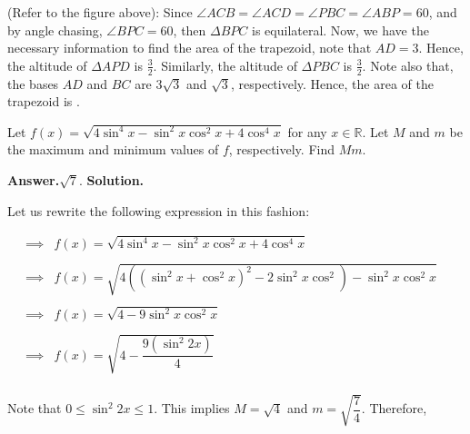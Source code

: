 \documentclass[12pt,paper=letter]{scrartcl}
\newcommand{\ans}[1]{{\sffamily \bfseries Answer.}\;\(\boxed{\text{#1}}\).}
\newcommand{\sol}{{\sffamily \bfseries Solution.}\;}
\begin{document}
(Refer to the figure above): Since $\angle ACB = \angle ACD = \angle PBC = \angle ABP = 60$, and by angle chasing, $\angle BPC = 60$, then $\Delta BPC$ is equilateral. Now, we have the necessary information to find the area of the trapezoid, note that $AD = 3$. Hence, the altitude of $\Delta APD$ is $\frac{3}{2}$. Similarly, the altitude of $\Delta PBC$ is $\frac{3}{2}$. Note also that, the bases $AD$ and $BC$ are $3\sqrt{3}$ and $\sqrt{3}$, respectively. Hence, the area of the trapezoid is .


\begin{probboxed} Let $f(x) = \sqrt{4\sin^4 x - \sin^2 x \cos^2 x + 4\cos^4 x }$ for any $x \in \mathbb{R}$. Let $M$ and $m$ be the maximum and minimum values of $f$, respectively. Find $Mm$.
\end{probboxed}

\ans{$\sqrt{7}$}
\sol

Let us rewrite the following expression in this fashion: 

\begin{equation*}
    \begin{array}{lll}
       \implies & f(x) = \sqrt{4\sin^4 x - \sin^2 x \cos^2 x + 4\cos^4 x }  & \\
         
         \\
         
         \implies & f(x) = \sqrt{4\left(\left(\sin^2 x + \cos^2 x\right)^2 - 2\sin^2 x \cos^2 \right) - \sin^2 x \cos^2 x}  \\
         
         \\
         
         \implies & f(x) = \sqrt{4 - 9\sin^2 x \cos^2x}  \\
         
         \\
         
        \implies & f(x) = \sqrt{4 - \dfrac{9(\sin^2 2x)}{4}}  \\ 
    \end{array}
\end{equation*}

Note that $0 \leq \sin^2 2x \leq 1$. This implies $M = \sqrt{4}$ and $m = \sqrt{\dfrac{7}{4}}$. Therefore, 
\end{document}
